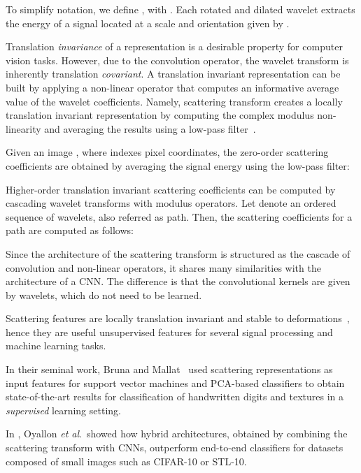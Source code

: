 \documentclass[11pt]{article}
\theoremstyle{definition}
\newcommand{\EtAl}{\textit{et al}}
\begin{document}
To simplify notation, we define , with . Each rotated and dilated wavelet extracts the energy of a signal located at a scale and orientation given by .

Translation \textit{invariance} of a representation is a desirable property for computer vision tasks. However, due to the convolution operator, the wavelet transform is inherently translation \textit{covariant}. A translation invariant representation can be built by applying a non-linear operator that computes an informative average value of the wavelet coefficients.
Namely, scattering transform creates a locally translation invariant representation by computing the complex modulus non-linearity and averaging the results using a low-pass filter~. 

Given an image , where  indexes pixel coordinates, the zero-order scattering coefficients  are obtained by averaging the signal energy using the low-pass filter:




Higher-order translation invariant scattering coefficients can be computed by cascading wavelet transforms with modulus operators. Let  denote an ordered sequence of wavelets, also referred as path. Then, the scattering coefficients for a path  are computed as follows:




Since the architecture of the scattering transform is structured as the cascade of convolution and non-linear operators, it shares many similarities with the architecture of a CNN.
The difference is that the convolutional kernels are given by wavelets, which do not need to be learned.


Scattering features are locally translation invariant and stable to deformations~\cite{Anden_DeepScatteringSpectrum_2014}, hence they are useful unsupervised features for several signal processing and machine learning tasks. 

In their seminal work, Bruna and Mallat~\cite{Bruna_InvariantScattering_2012} used scattering representations as input features for support vector machines and PCA-based classifiers to obtain state-of-the-art results for classification of handwritten digits and textures in a \emph{supervised} learning setting.  

In \cite{Oyallon_ScatteringHybridNetworks_2018}, Oyallon \EtAl.~showed how hybrid architectures, obtained by combining the scattering transform with CNNs, outperform end-to-end classifiers for datasets composed of small images such as CIFAR-10 or STL-10.
\end{document}
